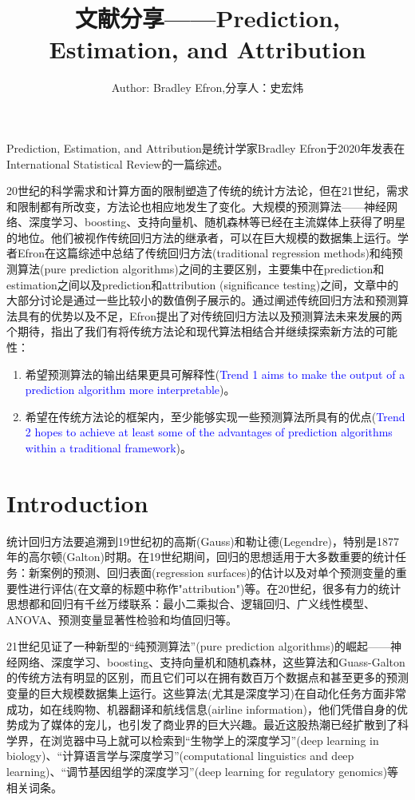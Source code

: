 \documentclass[lang=cn,11pt,a4paper,cite=authoryear]{elegantpaper}
\title{文献分享——Prediction, Estimation, and Attribution}
\author{Author: Bradley Efron,\quad 分享人：史宏炜}
\date{\zhtoday}
\begin{document}
\maketitle

Prediction, Estimation, and Attribution是统计学家Bradley Efron于2020年发表在International Statistical Review的一篇综述。

20世纪的科学需求和计算方面的限制塑造了传统的统计方法论，但在21世纪，需求和限制都有所改变，方法论也相应地发生了变化。大规模的预测算法——神经网络、深度学习、boosting、支持向量机、随机森林等已经在主流媒体上获得了明星的地位。他们被视作传统回归方法的继承者，可以在巨大规模的数据集上运行。学者Efron在这篇综述中总结了传统回归方法(traditional regression methods)和纯预测算法(pure prediction algorithms)之间的主要区别，主要集中在prediction和estimation之间以及prediction和attribution (significance testing)之间，文章中的大部分讨论是通过一些比较小的数值例子展示的。通过阐述传统回归方法和预测算法具有的优势以及不足，Efron提出了对传统回归方法以及预测算法未来发展的两个期待，指出了我们有将传统方法论和现代算法相结合并继续探索新方法的可能性：
\begin{enumerate}
	\item 希望预测算法的输出结果更具可解释性(\textcolor{blue}{Trend 1 aims to make the output of a prediction algorithm more interpretable})。
	\item 希望在传统方法论的框架内，至少能够实现一些预测算法所具有的优点(\textcolor{blue}{Trend 2 hopes to achieve at least some of the advantages of prediction algorithms within a traditional framework})。
\end{enumerate}

\section{Introduction}

统计回归方法要追溯到19世纪初的高斯(Gauss)和勒让德(Legendre)，特别是1877年的高尔顿(Galton)时期。在19世纪期间，回归的思想适用于大多数重要的统计任务：新案例的预测、回归表面(regression surfaces)的估计以及对单个预测变量的重要性进行评估(在文章的标题中称作"attribution")等。在20世纪，很多有力的统计思想都和回归有千丝万缕联系：最小二乘拟合、逻辑回归、广义线性模型、ANOVA、预测变量显著性检验和均值回归等。

21世纪见证了一种新型的“纯预测算法”(pure prediction algorithms)的崛起——神经网络、深度学习、boosting、支持向量机和随机森林，这些算法和Guass-Galton的传统方法有明显的区别，而且它们可以在拥有数百万个数据点和甚至更多的预测变量的巨大规模数据集上运行。这些算法(尤其是深度学习)在自动化任务方面非常成功，如在线购物、机器翻译和航线信息(airline information)，他们凭借自身的优势成为了媒体的宠儿，也引发了商业界的巨大兴趣。最近这股热潮已经扩散到了科学界，在浏览器中马上就可以检索到“生物学上的深度学习”(deep learning in biology)、“计算语言学与深度学习”(computational linguistics and deep learning)、“调节基因组学的深度学习”(deep learning for regulatory genomics)等相关词条。
\end{document}
